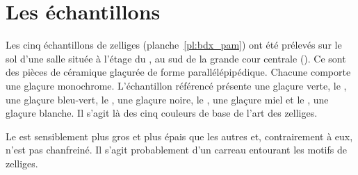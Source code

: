 \section{Les échantillons}

Les cinq échantillons de zelliges (planche~\ref{pl:bdx_pam}) ont été 
prélevés sur le sol d'une salle située à l'étage du \PaM, au sud de 
la grande cour centrale (). Ce sont des pièces de 
céramique glaçurée de forme parallélépipédique. Chacune comporte une 
glaçure monochrome. L'échantillon référencé  présente une 
glaçure verte, le , une glaçure bleu-vert, le , 
une glaçure noire, le , une glaçure miel et le , 
une glaçure blanche. Il s'agit là des cinq couleurs de base de l'art 
des zelliges.

Le  est sensiblement plus gros et plus épais que les autres 
et, contrairement à eux, n'est pas chanfreiné. Il s'agit probablement 
d'un carreau entourant les motifs de zelliges.




\cleardoublepage
\thispagestyle{empty}

